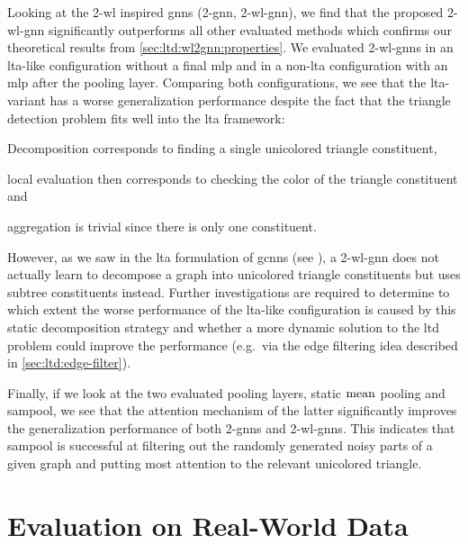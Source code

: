 Looking at the 2-\acs{wl} inspired \acp{gnn} (2-\acs{gnn}, 2-\acs{wl}-\acs{gnn}), we find that the proposed 2-\acs{wl}-\acs{gnn} significantly outperforms all other evaluated methods which confirms our theoretical results from \cref{sec:ltd:wl2gnn:properties}.
We evaluated 2-\acs{wl}-\acsp{gnn} in an \acs{lta}-like configuration without a final \ac{mlp} and in a non-\acs{lta} configuration with an \ac{mlp} after the pooling layer.
Comparing both configurations, we see that the \acs{lta}-variant has a worse generalization performance despite the fact that the triangle detection problem fits well into the \ac{lta} framework:
\begin{enumerate*}[label={\circled{\small\arabic*}}]
	\item Decomposition corresponds to finding a single unicolored triangle constituent,
	\item local evaluation then corresponds to checking the color of the triangle constituent and
	\item aggregation is trivial since there is only one constituent.
\end{enumerate*}

However, as we saw in the \ac{lta} formulation of \acp{gcnn} (see ), a 2-\acs{wl}-\acs{gnn} does not actually learn to decompose a graph into unicolored triangle constituents but uses subtree constituents instead.
Further investigations are required to determine to which extent the worse performance of the \acs{lta}-like configuration is caused by this static decomposition strategy and whether a more dynamic solution to the \acf{ltd} problem could improve the performance (e.g.\ via the edge filtering idea described in \cref{sec:ltd:edge-filter}).

Finally, if we look at the two evaluated pooling layers, static $\operatorname{mean}$ pooling and \ac{sampool}, we see that the attention mechanism of the latter significantly improves the generalization performance of both 2-\acsp{gnn} and 2-\acs{wl}-\acsp{gnn}.
This indicates that \ac{sampool} is successful at filtering out the randomly generated noisy parts of a given graph and putting most attention to the relevant unicolored triangle.

\section{Evaluation on Real-World Data}%
\label{sec:eval:real}


